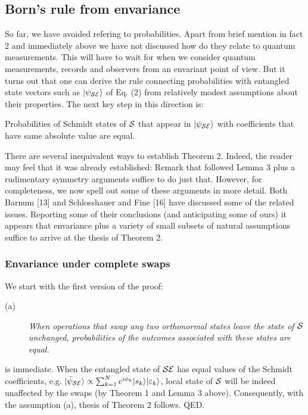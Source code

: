 \documentclass[aps,twocolumn,pra,epsfig]{revtex4}
\begin{document}
\subsection{Born's rule from envariance}

So far, we have avoided refering to probabilities. Apart from brief mention
in fact 2 and immediately above we have not discussed how do they relate to
quantum measurements. This will have to wait for when we consider quantum
measurements, records and observers from an envariant point of view. But it
turns out that one can derive the rule connecting probabilities with entangled
state vectors such as $|\psi_{\cal SE}\rangle$ of Eq. (2) from 
relatively modest
assumptions about their properties. The next key step in this direction is:

 Probabilities of Schmidt states of ${\cal S}$ that
appear in $|\psi_{\cal SE}\rangle$ with coefficients that have same absolute
value are equal.

There are several inequivalent ways to establish Theorem 2. Indeed, the reader
may feel that it was already established: Remark that followed Lemma 3 plus
a rudimentary symmetry arguments suffice to do just that. However,
for completeness, we now spell out some of these arguments in more detail.
Both Barnum [13] and Schlosshauer and Fine [16] have discussed some of the
related issues. Reporting some of their conclusions (and anticipating some
of ours) it appears that envariance plus a variety of small subsets of natural
assumptions suffice to arrive at the thesis of Theorem 2.

\subsubsection{Envariance under complete swaps}

We start with the first version of the proof:

\begin{description}
\item[(a)] {\it When operations that swap any two orthonormal states leave
the state of ${\cal S}$ unchanged, probabilities of the outcomes associated
with these states are equal.}
\end{description}
 is immediate. When the entangled state of ${\cal SE}$
has equal values of the Schmidt coefficients, e.g. $|\bar \psi_{\cal SE}\rangle
\propto \sum_{k=1}^N e^{i \phi_k} |s_k\rangle |\varepsilon_k\rangle $,
local state of ${\cal S}$ will be indeed unaffected by the swaps (by
Theorem 1 and Lemma 3 above). Consequently, with the assumption (a), thesis
of Theorem 2 follows. QED.
\end{document}
